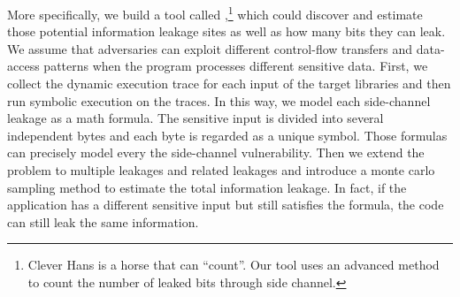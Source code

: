 More specifically, we build a tool called \tool{},\footnote{Clever Hans is a horse that can ``count''.
Our tool uses an advanced method to count the number of leaked bits through side channel.}
which could discover and estimate those potential information leakage sites 
as well as how many bits they can leak. 
We assume that adversaries can exploit different control-flow transfers and data-access patterns when 
the program processes different sensitive data. 
First, we collect the dynamic execution trace for each input of the target libraries 
and then run symbolic execution on the traces. 
In this way, we model each side-channel leakage as a math formula. 
The sensitive input is divided into several independent bytes and each byte is regarded as 
a unique symbol. Those formulas can precisely model every the side-channel vulnerability.
Then we extend the problem to multiple leakages and related leakages
and introduce a monte carlo sampling method to estimate the total information leakage.
In fact, if the application has a different sensitive input but still satisfies the formula, 
the code can still leak the same information. 





